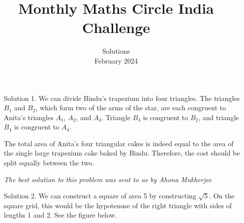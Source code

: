 \documentclass[a4paper,12pt]{article}
\title{Monthly Maths Circle India Challenge}
\date{Solutions\\February 2024}
\begin{document}
\maketitle
\thispagestyle{empty}
\begin{enumerate}
    \item[Solution 1.] We can divide Bindu's trapezium into four triangles. The triangles $B_1$ and $B_2$, which form two of the arms of the star, are each congruent to Anita's triangles $A_1$, $A_2$, and $A_3$. Triangle $B_3$ is congruent to $B_2$, and triangle $B_4$ is congruent to $A_4$.

    \begin{figure}[h]
        \centering
                        
    \end{figure}

    The total area of Anita's four triangular cakes is indeed equal to the area of the single large trapezium cake baked by Bindu. Therefore, the cost should be split equally between the two.

    \textit{The best solution to this problem was sent to us by Ahona Mukherjee}
    
    \item[Solution 2.] We can construct a square of area 5 by constructing $\sqrt{5}$. On the square grid, this would be the hypotenuse of the right triangle with sides of lengths 1 and 2. See the figure below.
    \begin{figure}[h]
        \centering
        
    \end{figure}
\end{enumerate}
\end{document}
